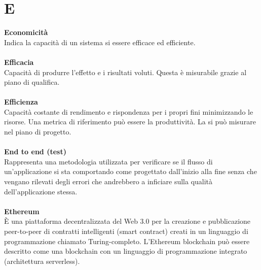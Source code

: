 \section{E}
\textbf{Economicità}\\
Indica la capacità di un sistema si essere efficace ed efficiente.\\ \\
\textbf{Efficacia}\\
Capacità di produrre l'effetto e i risultati voluti. Questa è misurabile grazie al piano di qualifica. \\ \\
\textbf{Efficienza}\\
Capacità costante di rendimento e rispondenza per i propri fini minimizzando le risorse. Una metrica di riferimento può essere la  produttività. La si può misurare nel piano di progetto. \\ \\
\textbf{End to end (test)}\\
Rappresenta una metodologia utilizzata per verificare se il flusso di un'applicazione si sta comportando come progettato dall'inizio alla fine senza che vengano rilevati degli errori che andrebbero a inficiare sulla qualità dell’applicazione stessa. \\ \\
\textbf{Ethereum}\\
È una piattaforma decentralizzata del Web 3.0 per la creazione e pubblicazione peer-to-peer di contratti intelligenti (smart contract) creati in un linguaggio di programmazione chiamato Turing-completo. L'Ethereum blockchain può essere descritto come una blockchain con un linguaggio di programmazione integrato (architettura serverless). \\ \\
\clearpage